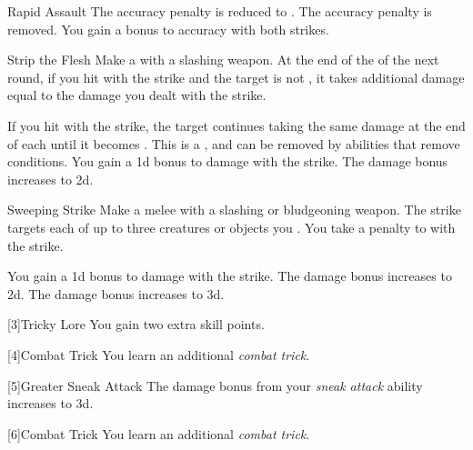 {\begin{apability}{Rapid Assault}
                \rankline
                 The accuracy penalty is reduced to .
                 The accuracy penalty is removed.
                 You gain a  bonus to accuracy with both strikes.
            \end{apability}

            \begin{apability}{Strip the Flesh}
                Make a  with a slashing weapon.
                At the end of the  of the next round, if you hit with the strike and the target is not , it takes additional damage equal to the damage you dealt with the strike.

                \rankline
                 If you hit with the strike, the target continues taking the same damage at the end of each  until it becomes .
                This is a , and can be removed by abilities that remove conditions.
                 You gain a \plus1d bonus to damage with the strike.
                 The damage bonus increases to \plus2d.
            \end{apability}

            \begin{apability}{Sweeping Strike}
                Make a melee  with a slashing or bludgeoning weapon.
                The strike targets each of up to three creatures or objects you .
                You take a  penalty to  with the strike.

                \rankline
                 You gain a \plus1d bonus to damage with the strike.
                 The damage bonus increases to \plus2d.
                 The damage bonus increases to \plus3d.
            \end{apability}
        }

        [3]{Tricky Lore} You gain two extra skill points.

        [4]{Combat Trick}
        You learn an additional \textit{combat trick}.

        [5]{Greater Sneak Attack} The damage bonus from your \textit{sneak attack} ability increases to \plus3d.

        [6]{Combat Trick}
        You learn an additional \textit{combat trick}.

